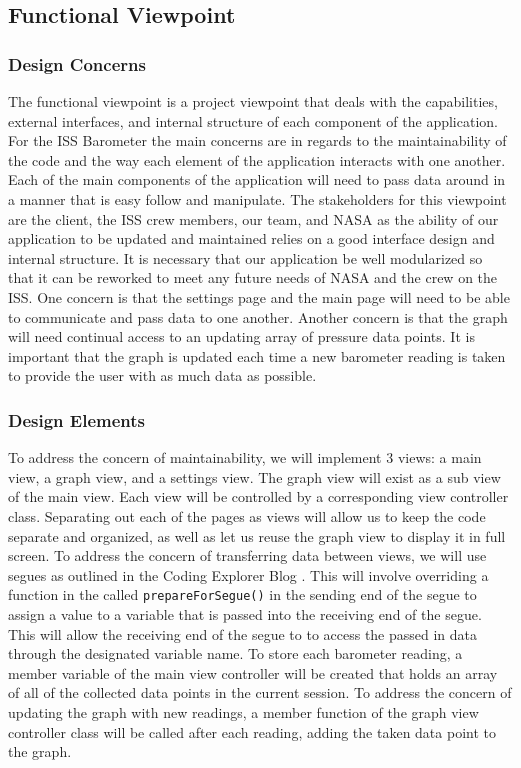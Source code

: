 \documentclass[onecolumn, draftclsnofoot,10pt, compsoc]{IEEEtran}
\begin{document}
\subsection{Functional Viewpoint}
\subsubsection{Design Concerns}
The functional viewpoint is a project viewpoint that deals with the capabilities, external interfaces, and internal structure of each component of the application.
For the ISS Barometer the main concerns are in regards to the maintainability of the code and the way each element of the application interacts with one another.
Each of the main components of the application will need to pass data around in a manner that is easy follow and manipulate.
The stakeholders for this viewpoint are the client, the ISS crew members, our team, and NASA as the ability of our application to be updated and maintained relies on a good interface design and internal structure.
It is necessary that our application be well modularized so that it can be reworked to meet any future needs of NASA and the crew on the ISS.
One concern is that the settings page and the main page will need to be able to communicate and pass data to one another.
Another concern is that the graph will need continual access to an updating array of pressure data points.
It is important that the graph is updated each time a new barometer reading is taken to provide the user with as much data as possible.

\subsubsection{Design Elements}
To address the concern of maintainability, we will implement 3 views: a main view, a graph view, and a settings view.
The graph view will exist as a sub view of the main view.
Each view will be controlled by a corresponding view controller class.
Separating out each of the pages as views will allow us to keep the code separate and organized, as well as let us reuse the graph view to display it in full screen.
To address the concern of transferring data between views, we will use segues as outlined in the Coding Explorer Blog \cite{dataThroughSeque}.
This will involve overriding a function in the called \texttt{prepareForSegue()} in the sending end of the segue to assign a value to a variable that is passed into the receiving end of the segue.
This will allow the receiving end of the segue to to access the passed in data through the designated variable name.
To store each barometer reading, a member variable of the main view controller will be created that holds an array of all of the collected data points in the current session.
To address the concern of updating the graph with new readings, a member function of the graph view controller class will be called after each reading, adding the taken data point to the graph.
\end{document}
